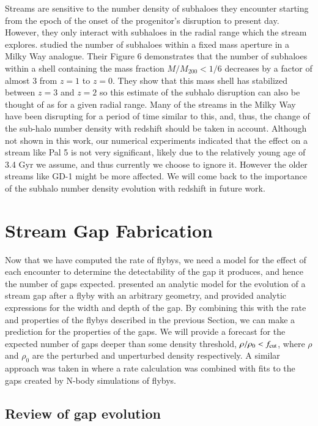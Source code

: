 \documentclass[useAMS,usenatbib]{mn2e}
\begin{document}
Streams are sensitive to the number density of subhaloes they
encounter starting from the epoch of the onset of the progenitor's
disruption to present day. However, they only interact with subhaloes
in the radial range which the stream
explores. \cite{diemand_et_al_2007} studied the number of subhaloes
within a fixed mass aperture in a Milky Way analogue. Their Figure 6
demonstrates that the number of subhaloes within a shell containing
the mass fraction $M/M_{200} < 1/6$ decreases by a factor of almost 3
from $z=1$ to $z=0$. They show that this mass shell has stabilized
between $z=3$ and $z=2$ so this estimate of the subhalo disruption can
also be thought of as for a given radial range. Many of the streams in
the Milky Way have been disrupting for a period of time similar to
this, and, thus, the change of the sub-halo number density with
redshift should be taken in account. Although not shown in this work,
our numerical experiments indicated that the effect on a stream like
Pal 5 is not very significant, likely due to the relatively young age
of 3.4 Gyr we assume, and thus currently we choose to ignore
it. However the older streams like GD-1 might be more affected. We
will come back to the importance of the subhalo number density
evolution with redshift in future work.

\section{Stream Gap Fabrication} \label{sec:method}

Now that we have computed the rate of flybys, we need a model for the effect of each encounter to determine the detectability of the gap it produces, and hence the number of gaps expected. \cite{three_phases} presented an analytic model for the evolution of a stream gap after a flyby with an arbitrary geometry, and provided analytic expressions for the width and depth of the gap. By combining this with the rate and properties of the flybys described in the previous Section, we can make a prediction for the properties of the gaps. We will provide a forecast for the expected number of gaps deeper than some density threshold, $\rho/\rho_0 < f_{\rm cut}$, where $\rho$ and $\rho_0$ are the perturbed and unperturbed density respectively. A similar approach was taken in \cite{carlberg_2012} where a rate calculation was combined with fits to the gaps created by N-body simulations of flybys.


\subsection{Review of gap evolution}
\end{document}
